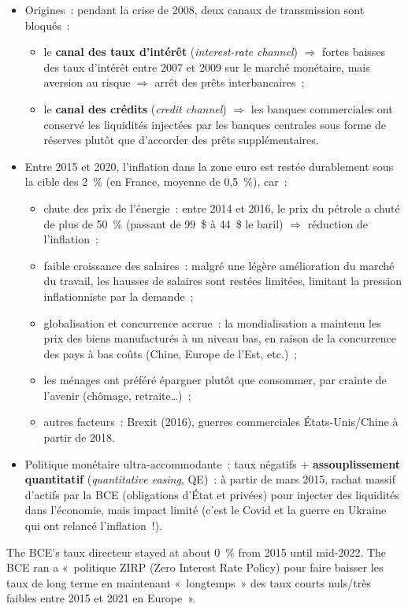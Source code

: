 \begin{itemize}
  \item Origines~: pendant la crise de 2008, deux canaux de transmission sont bloqués~:
    \begin{itemize}
      \item le \textbf{canal des taux d'intérêt} (\textit{interest-rate channel})
        $\Rightarrow$ fortes baisses des taux d'intérêt entre 2007 et 2009 sur le marché
        monétaire, mais aversion au risque $\Rightarrow$ arrêt des prêts
        interbancaires~;
      \item le \textbf{canal des crédits} (\textit{credit channel}) $\Rightarrow$ les
        banques commerciales ont conservé les liquidités injectées par les banques
        centrales sous forme de réserves plutôt que d'accorder des prêts
        supplémentaires.
    \end{itemize}
  \item Entre 2015 et 2020, l'inflation dans la zone euro est restée durablement sous la
    cible des 2~\% (en France, moyenne de 0,5~\%), car~:
    \begin{itemize}
      \item chute des prix de l'énergie~: entre 2014 et 2016, le prix du pétrole a chuté
        de plus de 50~\% (passant de 99~\$ à 44~\$ le baril) $\Rightarrow$ réduction de
        l'inflation~;
      \item faible croissance des salaires~: malgré une légère amélioration du marché du
        travail, les hausses de salaires sont restées limitées, limitant la pression
        inflationniste par la demande~;
      \item globalisation et concurrence accrue~: la mondialisation a maintenu les prix
        des biens manufacturés à un niveau bas, en raison de la concurrence des pays à
        bas coûts (Chine, Europe de l'Est, etc.)~;
      \item les ménages ont préféré épargner plutôt que consommer, par crainte de
        l'avenir (chômage, retraite\ldots)~;
      \item autres facteurs~: Brexit (2016), guerres commerciales États-Unis/Chine à
        partir de 2018.
    \end{itemize}
  \item Politique monétaire ultra-accommodante~: taux négatifs + \textbf{assouplissement
    quantitatif} (\textit{quantitative easing}, QE)~: à partir de mars 2015, rachat
    massif d'actifs par la BCE (obligations d'État et privées) pour injecter des
    liquidités dans l'économie, mais impact limité (c'est le Covid et la guerre en
    Ukraine qui ont relancé l'inflation~!).
\end{itemize}
The BCE's taux directeur stayed at about 0~\% from 2015 until mid-2022. The BCE ran a
«~politique ZIRP (Zero Interest Rate Policy) pour faire baisser les taux de long terme
en maintenant «~longtemps~» des taux courts nuls/très faibles entre 2015 et 2021 en
Europe~».

